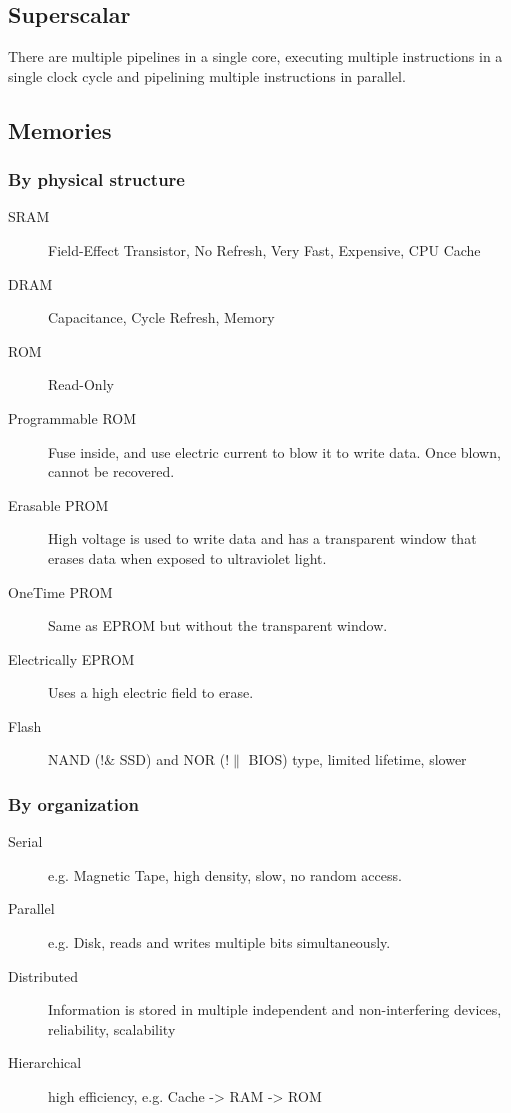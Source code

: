 \documentclass[11pt,journal,compsoc]{IEEEtran}
\begin{document}
\subsection{Superscalar}

There are multiple pipelines in a single core, executing multiple instructions in a single clock cycle and pipelining multiple instructions in parallel.


\subsection{Memories}


\subsubsection{By physical structure}

\begin{description}
    \item[SRAM] Field-Effect Transistor, No Refresh, Very Fast, Expensive, CPU Cache

    \item[DRAM] Capacitance, Cycle Refresh, Memory

    \item[ROM] Read-Only

    \item[Programmable ROM] Fuse inside, and use electric current to blow it to write data. Once blown, cannot be recovered.

    \item[Erasable PROM] High voltage is used to write data and has a transparent window that erases data when exposed to ultraviolet light.

    \item[OneTime PROM] Same as EPROM but without the transparent window.

    \item[Electrically EPROM] Uses a high electric field to erase.

    \item[Flash] NAND ($! \&$ SSD) and NOR ($! \|$ BIOS) type, limited lifetime, slower
\end{description}


\subsubsection{By organization}

\begin{description}
    \item[Serial] e.g. Magnetic Tape, high density, slow, no random access.

    \item[Parallel] e.g. Disk, reads and writes multiple bits simultaneously.

    \item[Distributed] Information is stored in multiple independent and non-interfering devices, reliability, scalability

    \item[Hierarchical] high efficiency, e.g. Cache -> RAM -> ROM
\end{description}
\end{document}
